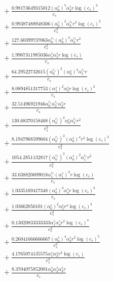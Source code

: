 \documentclass[10pt]{article}
\begin{document}
\begin{align*}
&{}  + \frac{0.98173649315012 \left(\alpha_{0}^s\right)^{5} \alpha_{2}^s r \log{\left(c_{s} \right)}^{3}}{c_{s}} \\
&{}  + \frac{0.99387488948306 \left(\alpha_{0}^s\right)^{2} \alpha_{3}^{c_s} r^{3} \log{\left(c_{s} \right)}^{2}}{c_{s}^{3}} \\
&{}  + \frac{127.60399737063 \alpha_{0}^{c_s} \left(\alpha_{0}^s\right)^{2} \alpha_{3}^{c_s} r^{2}}{c_{s}^{2}} \\
&{}  + \frac{1.9967311985036 \alpha_{1}^s \alpha_{5}^s r \log{\left(c_{s} \right)}}{c_{s}} \\
&{}  + \frac{64.29522732615 \left(\alpha_{0}^{c_s}\right)^{2} \left(\alpha_{0}^s\right)^{4} \alpha_{1}^{c_s} r}{c_{s}} \\
&{}  + \frac{8.0894851317753 \left(\alpha_{1}^s\right)^{2} \alpha_{3}^s r \log{\left(c_{s} \right)}^{2}}{c_{s}} \\
&{}  + \frac{32.51496921946 \alpha_{0}^{c_s} \alpha_{2}^{c_s} \alpha_{3}^s r}{c_{s}} \\
&{}  + \frac{130.68370158468 \left(\alpha_{0}^{c_s}\right)^{2} \alpha_{0}^s \alpha_{3}^{c_s} r^{2}}{c_{s}^{2}} \\
&{}  + \frac{8.1947968599604 \left(\alpha_{0}^{c_s}\right)^{3} \left(\alpha_{0}^s\right)^{4} r^{2} \log{\left(c_{s} \right)}^{3}}{c_{s}^{2}} \\
&{}  + \frac{1054.2851132817 \left(\alpha_{0}^{c_s}\right)^{3} \left(\alpha_{0}^s\right)^{2} \alpha_{1}^{c_s} r^{2}}{c_{s}^{2}} \\
&{}  + \frac{33.038820699018 \alpha_{1}^{c_s} \left(\alpha_{1}^s\right)^{3} r \log{\left(c_{s} \right)}}{c_{s}} \\
&{}  + \frac{1.0335169417348 \left(\alpha_{0}^s\right)^{3} \alpha_{4}^s r \log{\left(c_{s} \right)}^{3}}{c_{s}} \\
&{}  + \frac{1.03662056101 \left(\alpha_{0}^s\right)^{2} \alpha_{2}^s r^{4} \log{\left(c_{s} \right)}^{3}}{c_{s}^{4}} \\
&{}  + \frac{0.13020833333333 \alpha_{1}^s \alpha_{4}^s r^{2} \log{\left(c_{s} \right)}^{4}}{c_{s}^{2}} \\
&{}  + \frac{0.26041666666667 \left(\alpha_{0}^s\right)^{4} \alpha_{2}^s r^{2} \log{\left(c_{s} \right)}^{5}}{c_{s}^{2}} \\
&{}  + \frac{4.1765074135575 \alpha_{1}^s \alpha_{3}^s r^{3} \log{\left(c_{s} \right)}}{c_{s}^{3}} \\
&{}  + \frac{8.3704075852001 \alpha_{0}^s \alpha_{2}^s \alpha_{3}^s r}{c_{s}} \\

\end{align*}
\end{document}
